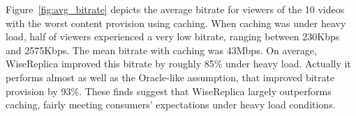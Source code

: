 Figure~\ref{fig:avg_bitrate} depicts the average bitrate for viewers of the 10 videos with the worst content provision using caching. When caching was under heavy load, half of viewers experienced a very low bitrate, ranging between 230Kbps and 2575Kbps. The mean bitrate with caching was 43Mbps. On average, WiseReplica improved this bitrate by roughly 85\% under heavy load. Actually it performs almost as well as the Oracle-like assumption, that improved bitrate provision by 93\%. These finds suggest that WiseReplica largely outperforms caching, fairly meeting consumers' expectations under heavy load conditions.


